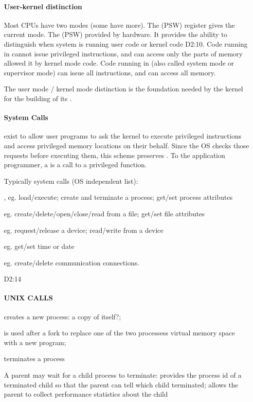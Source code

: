 \paragraph{User-kernel distinction}
Most CPUs have two modes (some have more). The 
(PSW) register gives the current mode. The  (PSW) provided by hardware. It provides the ability to
distinguish when system is running user code or kernel code D2:10.
Code running in  cannot issue privileged instructions, and
can access only the parts of memory allowed it by kernel mode code.
Code running in  (also called system mode or supervisor
mode) can issue all instructions, and can access all memory.

The user mode / kernel mode distinction is the foundation needed by the
kernel for the building of its .

\paragraph{System Calls}
 exist to allow user programs to ask the kernel to execute
privileged instructions and access privileged memory locations on their
behalf. Since the OS checks those requests before executing them, this
scheme preserves .
To the application programmer, a  is a call to a privileged
function.

Typically system calls (OS independent list):
\begin{compactitem}
\item {}, eg. load/execute; create and terminate a process;
get/set process attributes
\item {} eg. create/delete/open/close/read from a file;
get/set file attributes
\item {} eg. request/release a device; read/write from a
device
\item {} eg. get/set time or date
\item {} eg. create/delete communication connections.
\end{compactitem}

D2:14

\paragraph{UNIX CALLS}
\begin{compactitem} 
\item {} creates a new process: a copy of itself?;
\item {} is used after a fork to replace one of the two processess virtual
memory space with a new program;
\item {} terminates a process
\end{compactitem}
A parent may wait for a child process to terminate:  provides the
process id of a terminated child so that the parent can tell which child
terminated;  allows the parent to collect performance statistics
about the child

